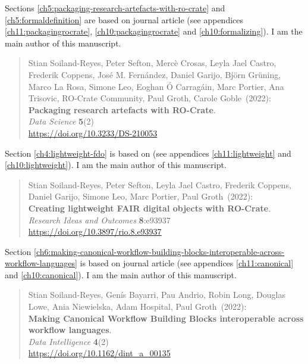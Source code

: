 Sections \ref{ch5:packaging-research-artefacts-with-ro-crate} and \ref{ch5:formaldefinition} are based on journal article \cite{Soiland-Reyes 2022a} (see appendices \ref{ch11:packagingrocrate}, \ref{ch10:packagingrocrate} and \ref{ch10:formalizing}). I am the main author of this manuscript.

\begin{quote}
    \small
    Stian Soiland-Reyes, Peter Sefton, Mercè Crosas, Leyla Jael Castro, Frederik Coppens, José M. Fernández, Daniel Garijo, Björn Grüning, Marco La Rosa, Simone Leo, Eoghan Ó Carragáin, Marc Portier, Ana Trisovic, RO-Crate Community, Paul Groth, Carole Goble~(2022): \\
    \textbf{Packaging research artefacts with RO-Crate}.\\
    \emph{Data Science} \textbf{5}(2)\\
    \url{https://doi.org/10.3233/DS-210053}\\
\end{quote}

Section \ref{ch4:lightweight-fdo} is based on \cite{Soiland-Reyes 2022c} (see appendices \ref{ch11:lightweight} and \ref{ch10:lightweight}). I am the main author of this manuscript.

\begin{quote}
    \small
    Stian Soiland-Reyes, Peter Sefton, Leyla Jael Castro, Frederik Coppens, Daniel Garijo, Simone Leo, Marc Portier, Paul Groth~(2022): \\
    \textbf{Creating lightweight FAIR digital objects with RO-Crate}.\\
    \emph{Research Ideas and Outcomes} \textbf{8}:e93937 \\
    \url{https://doi.org/10.3897/rio.8.e93937}    
\end{quote}

Section \ref{ch6:making-canonical-workflow-building-blocks-interoperable-across-workflow-languages} is based on journal article \cite{Soiland-Reyes 2022b} (see appendices \ref{ch11:canonical} and \ref{ch10:canonical}). I am the main author of this manuscript.

\begin{quote}
    \small
    Stian Soiland-Reyes, Genís Bayarri, Pau Andrio, Robin Long, Douglas Lowe, Ania Niewielska, Adam Hospital, Paul Groth~(2022): \\
    \textbf{Making Canonical Workflow Building Blocks interoperable across workflow languages}.\\
    \emph{Data Intelligence} \textbf{4}(2)\\
    \url{https://doi.org/10.1162/dint_a_00135}    
\end{quote}

